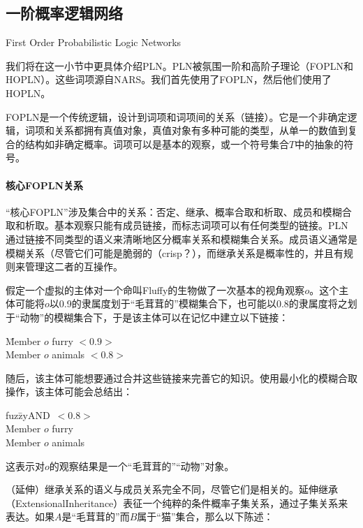 \subsection{一阶概率逻辑网络}{First Order Probabilistic Logic Networks}

我们将在这一小节中更具体介绍PLN。PLN被氛围一阶和高阶子理论（FOPLN和HOPLN）。这些词项源自NARS\cite{Wang2006}。我们首先使用了FOPLN，然后他们使用了HOPLN。

FOPLN是一个传统逻辑，设计到词项和词项间的关系（链接）。它是一个非确定逻辑，词项和关系都拥有真值对象，真值对象有多种可能的类型，从单一的数值到复合的结构如非确定概率。词项可以是基本的观察，或一个符号集合$T$中的抽象的符号。

\paragraph{核心FOPLN关系}

“核心FOPLN”涉及集合中的关系：否定、继承、概率合取和析取、成员和模糊合取和析取。基本观察只能有成员链接，而标志词项可以有任何类型的链接。PLN通过链接不同类型的语义来清晰地区分概率关系和模糊集合关系。成员语义通常是模糊关系（尽管它们可能是脆弱的（crisp？），而继承关系是概率性的，并且有规则来管理这二者的互操作。

假定一个虚拟的主体对一个命叫Fluffy的生物做了一次基本的视角观察$o$。这个主体可能将$o$以0.9的隶属度划于“毛茸茸的”模糊集合下，也可能以0.8的隶属度将之划于“动物”的模糊集合下，于是该主体可以在记忆中建立以下链接：

 \begin{tabbing}
\=Member $o$ furry $<0.9>$\\
\>Member $o$ animals $<0.8>$\\
\end{tabbing}

随后，该主体可能想要通过合并这些链接来完善它的知识。使用最小化的模糊合取操作，该主体可能会总结出：

 \begin{tabbing}
fuz\=zyAND\ $<0.8>$\\
\> Member $o$ furry \\
\> Member $o$ animals \\
\end{tabbing}

这表示对$o$的观察结果是一个“毛茸茸的”“动物”对象。

（延伸）继承关系的语义与成员关系完全不同，尽管它们是相关的。延伸继承（ExtensionalInheritance）表征一个纯粹的条件概率子集关系，通过子集关系来表达。如果$A$是“毛茸茸的”而$B$属于“猫”集合，那么以下陈述：

